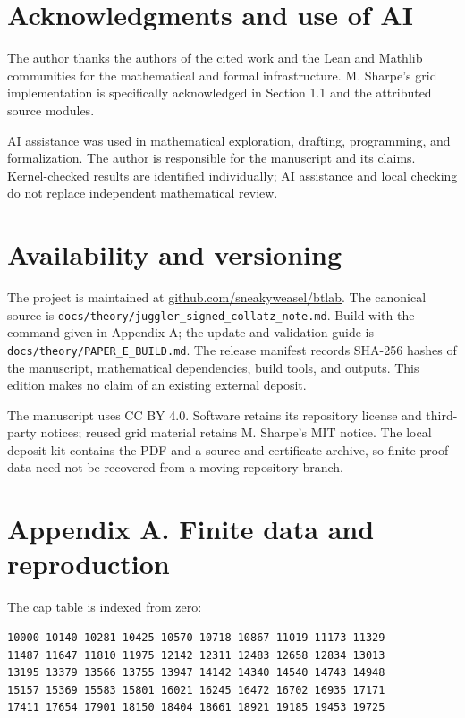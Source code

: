 \documentclass[11pt,a4paper]{article}
\begin{document}
\section{Acknowledgments and use of
AI}\label{acknowledgments-and-use-of-ai}

The author thanks the authors of the cited work and the Lean and Mathlib
communities for the mathematical and formal infrastructure. M. Sharpe's
grid implementation is specifically acknowledged in Section 1.1 and the
attributed source modules.

AI assistance was used in mathematical exploration, drafting,
programming, and formalization. The author is responsible for the
manuscript and its claims. Kernel-checked results are identified
individually; AI assistance and local checking do not replace
independent mathematical review.

\section{Availability and versioning}\label{availability-and-versioning}

The project is maintained at
\href{https://github.com/sneakyweasel/btlab}{github.com/sneakyweasel/btlab}.
The canonical source is
\texttt{\nolinkurl{docs/theory/juggler_signed_collatz_note.md}}. Build
with the command given in Appendix A; the update and validation guide is
\texttt{\nolinkurl{docs/theory/PAPER_E_BUILD.md}}. The release manifest
records SHA-256 hashes of the manuscript, mathematical dependencies,
build tools, and outputs. This edition makes no claim of an existing
external deposit.

The manuscript uses CC BY 4.0. Software retains its repository license
and third-party notices; reused grid material retains M. Sharpe's MIT
notice. The local deposit kit contains the PDF and a
source-and-certificate archive, so finite proof data need not be
recovered from a moving repository branch.

\section{Appendix A. Finite data and
reproduction}\label{appendix-a.-finite-data-and-reproduction}

The cap table is indexed from zero:

\begin{verbatim}
10000 10140 10281 10425 10570 10718 10867 11019 11173 11329
11487 11647 11810 11975 12142 12311 12483 12658 12834 13013
13195 13379 13566 13755 13947 14142 14340 14540 14743 14948
15157 15369 15583 15801 16021 16245 16472 16702 16935 17171
17411 17654 17901 18150 18404 18661 18921 19185 19453 19725
\end{verbatim}
\end{document}
